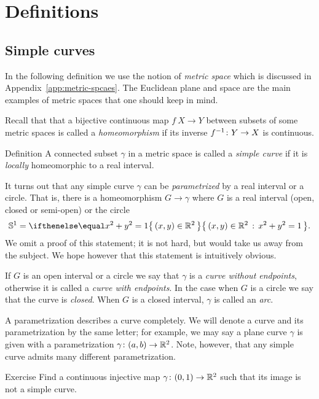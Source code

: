 \chapter{Definitions}


\section*{Simple curves}

In the following definition we use the notion of \emph{metric space} which is discussed in Appendix~\ref{app:metric-spcaes}.
The Euclidean plane and space are the main examples of metric spaces that one should keep in mind. 

Recall that that a bijective continuous map $f\:X\to Y$ between subsets of some metric spaces is called a \emph{homeomorphism} if its inverse $f^{-1}\:Y\z\to X$ is continuous.  

\begin{thm}{Definition} 
A connected subset $\gamma$ in a metric space is called a \emph{simple curve} if it is \emph{locally} homeomorphic to a real interval.
\end{thm}

It turns out that any simple curve $\gamma$ can be \emph{parametrized} by a real interval or a circle.
That is, there is a homeomorphism $G\to\gamma$ 
where $G$ is a real interval (open, closed or semi-open) or the circle
\[\SS^1=\set{(x,y)\in\RR^2}{x^2+y^2=1}.\]
We omit a proof of this statement; it is not hard, but would take us away from the subject.
We hope however that this statement is intuitively obvious. %

If $G$ is an open interval or a circle we say that $\gamma$ is a \emph{curve without endpoints}, otherwise it is 
called a \emph{curve with endpoints}. In the case when $G$ is a circle we say that the curve is \emph{closed}. 
When $G$ is a closed interval, $\gamma$ is called an \emph{arc}.


A parametrization describes a curve completely.
We will denote a curve and its parametrization by the same letter;
for example, we may say a plane curve $\gamma$ is given with a parametrization $\gamma\:(a,b)\z\to \RR^2$.
Note, however, that any simple curve admits many different parametrization. 

\begin{thm}{Exercise}\label{ex:9}
Find a continuous injective map $\gamma\colon(0,1)\to\mathbb{R}^2$ such that its image is not a simple curve.
\end{thm}


